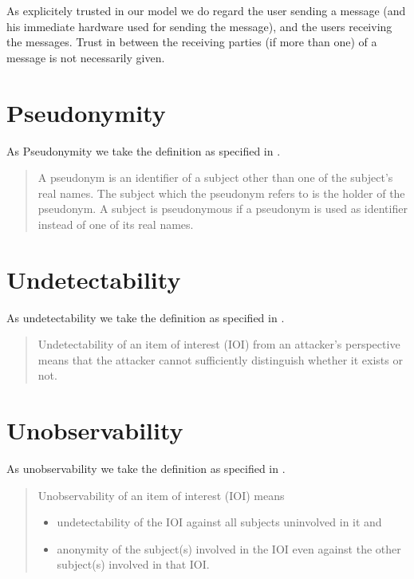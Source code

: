 As explicitely trusted in our model we do regard the user sending a message (and his immediate hardware used for sending the message), and the users receiving the messages. Trust in between the receiving parties (if more than one) of a message is not necessarily given.

\section{Pseudonymity}
As Pseudonymity we take the definition as specified in \cite{anon_terminology}.

\begin{quote}
	A pseudonym is an identifier of a subject other than one of the subject's real
	names. The subject which the pseudonym refers to is the holder of the pseudonym. A subject is pseudonymous if a pseudonym is used as identifier instead of one of its real names.\omitted
\end{quote}

\section{Undetectability}
As undetectability we take the definition as specified in \cite{anon_terminology}.

\begin{quote}
	Undetectability of an item of interest (IOI) from an attacker's perspective means that the
	attacker cannot sufficiently distinguish whether it exists or not.\omitted
\end{quote}

\section{Unobservability}
As unobservability we take the definition as specified in \cite{anon_terminology}.

\begin{quote}
	Unobservability of an item of interest (IOI) means
	\begin{itemize}
		\item undetectability of the IOI against all subjects uninvolved in it and
		\item anonymity of the subject(s) involved in the IOI even against the other subject(s) involved in that IOI.
	\end{itemize}
	
\end{quote}

